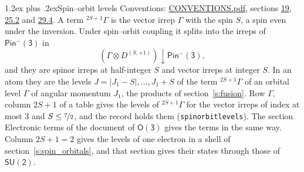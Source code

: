 \documentclass[10pt,a4paper]{article}
\makeatletter
\renewcommand\section{\@startsection{section}{1}{\z@}{-3ex plus -1ex minus -.2ex}%
  {1.2ex plus .2ex}{\normalfont\large\sffamily\bfseries\color{parttitle}}}
\numberwithin{equation}{section}
\newcommand{\grp}[1]{\mathsf{#1}}
\newcommand{\restr}[2]{#1\!\downarrow#2}
\newcommand{\irrJp}[2]{D^{(#1,#2)}}
\newcommand{\irrprod}{\otimes}
\newcommand{\term}[2]{{}^{#1}#2}
\makeatother
\begin{document}
\section{Spin--orbit levels}\label{s:spin_orbit}
Conventions: \href{../../CONVENTIONS.pdf}{CONVENTIONS.pdf}, sections \href{../../../rotation/CONVENTIONS.pdf\#conv.19}{19}, \href{../../CONVENTIONS.pdf\#conv.25.2}{25.2} and \href{../../CONVENTIONS.pdf\#conv.29.4}{29.4}.
\leavevmode\label{n:local.spin}\label{n:symbol.term}A term $\term{2S+1}{\Gamma}$ is the vector irrep $\Gamma$ with the spin $S$, a spin even under the inversion. Under spin--orbit coupling it splits into the irreps of $\grp{Pin^{-}(3)}$ in
\begin{equation}\label{e:spinorbit}\restr{(\Gamma \irrprod \irrJp{S}{+1})}{\grp{Pin^{-}(3)}},\end{equation}
and they are spinor irreps at half-integer $S$ and vector irreps at integer $S$. In an atom they are the levels $J = \lvert J_1 - S\rvert, \dots, J_1 + S$ of the term $\term{2S+1}{\Gamma}$ of an orbital level $\Gamma$ of angular momentum $J_1$, the products of section~\ref{s:fusion}. Row $\Gamma$, column $2S + 1$ of a table gives the levels of $\term{2S+1}{\Gamma}$ for the vector irreps of index at most 3 and $S \le \nicefrac{7}{2}$, and the record holds them (\texttt{spinorbitlevels}). The section Electronic terms of the document of \href{../../../rotation/data/pdf/O3.pdf}{$\grp{O(3)}$} gives the terms in the same way. Column $2S + 1 = 2$ gives the levels of one electron in a shell of section~\ref{s:spin_orbitals}, and that section gives their states through those of \href{SU2.pdf}{$\grp{SU(2)}$}.
\end{document}
